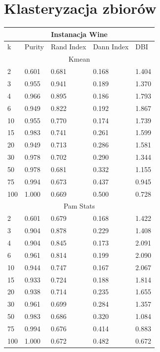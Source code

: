 \documentclass[12pt,a4paper]{article}
\begin{document}
\section{Klasteryzacja zbiorów}
\begin{tabular}{ |p{1.5cm}||p{2.5cm}|p{2.5cm}|p{2.5cm}|p{2.5cm}| }
\hline
\multicolumn{5}{|c|}{Instanacja Wine}\\
\hline
k &Purity & Rand Index & Dann Index & DBI \\
\hline
\hline
\multicolumn{5}{|c|}{Kmean}\\
\hline
2 & 0.601 & 0.681 & 0.168 & 1.404\\
3 & 0.955 & 0.941 & 0.189 & 1.370\\
4 & 0.966 & 0.895 & 0.186 & 1.793\\
6 & 0.949 & 0.822 & 0.192 & 1.867\\
10 & 0.955 & 0.770 & 0.174 & 1.739\\
15 & 0.983 & 0.741 & 0.261 & 1.599\\
20 & 0.949 & 0.713 & 0.286 & 1.581\\
30 & 0.978 & 0.702 & 0.290 & 1.344\\
50 & 0.978 & 0.681 & 0.332 & 1.155\\
75 & 0.994 & 0.673 & 0.437 & 0.945\\
100 & 1.000 & 0.669 & 0.500 & 0.728\\
\hline
\multicolumn{5}{|c|}{Pam Stats}\\
\hline
2 & 0.601 & 0.679 & 0.168 & 1.422\\
3 & 0.904 & 0.878 & 0.229 & 1.408\\
4 & 0.904 & 0.845 & 0.173 & 2.091\\
6 & 0.961 & 0.814 & 0.199 & 2.090\\
10 & 0.944 & 0.747 & 0.167 & 2.067\\
15 & 0.933 & 0.724 & 0.188 & 1.814\\
20 & 0.938 & 0.714 & 0.235 & 1.655\\
30 & 0.961 & 0.699 & 0.284 & 1.357\\
50 & 0.983 & 0.686 & 0.320 & 1.084\\
75 & 0.994 & 0.676 & 0.414 & 0.883\\
100 & 1.000 & 0.672 & 0.482 & 0.672\\
\hline
\end{tabular}
\end{document}
